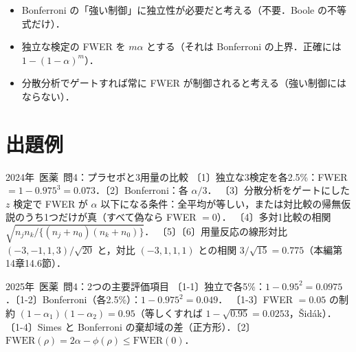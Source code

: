 \documentclass[a4paper,11pt,openany]{ltjsbook}
\newcommand{\kakomon}[2]{\mbox{#1年 医薬 問#2}}
\begin{document}
\begin{warnbox}
\begin{itemize}
\item Bonferroni の「強い制御」に独立性が必要だと考える（不要．Boole の不等式だけ）．
\item 独立な検定の FWER を $m\alpha$ とする（それは Bonferroni の上界．正確には $1-(1-\alpha)^m$）．
\item 分散分析でゲートすれば常に FWER が制御されると考える（強い制御にはならない）．
\end{itemize}
\end{warnbox}

\section{出題例}\label{sec:m08-shutsudai}
\begin{shutsudai}{\kakomon{2024}{4}：プラセボと3用量の比較}
〔1〕独立な3検定を各2.5\%：FWER $=1-0.975^3=0.073$．〔2〕Bonferroni：各 $\alpha/3$．
〔3〕分散分析をゲートにした $z$ 検定で FWER が $\alpha$ 以下になる条件：全平均が等しい，または対比較の帰無仮説のうち1つだけが真（すべて偽なら FWER $=0$）．
〔4〕多対1比較の相関 $\sqrt{n_jn_k/\{(n_j+n_0)(n_k+n_0)\}}$．
〔5〕〔6〕用量反応の線形対比 $(-3,-1,1,3)/\sqrt{20}$ と，対比 $(-3,1,1,1)$ との相関 $3/\sqrt{15}=0.775$（本編第14章14.6節）．
\end{shutsudai}
\begin{shutsudai}{\kakomon{2025}{4}：2つの主要評価項目}
〔1-1〕独立で各5\%：$1-0.95^2=0.0975$．〔1-2〕Bonferroni（各2.5\%）：$1-0.975^2=0.049$．
〔1-3〕FWER $=0.05$ の制約 $(1-\alpha_1)(1-\alpha_2)=0.95$（等しくすれば $1-\sqrt{0.95}=0.0253$，Šidák）．
〔1-4〕Simes と Bonferroni の棄却域の差（正方形）．〔2〕$\mathrm{FWER}(\rho)=2\alpha-\phi(\rho)\le\mathrm{FWER}(0)$．
\end{shutsudai}

\end{document}
